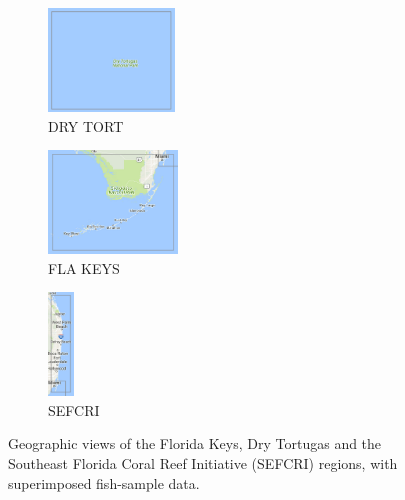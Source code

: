 \documentclass[letterpaper]{article} %
\begin{document}
\begin{figure}
  \centering
    \begin{subfigure}[b]{.4\columnwidth}
      \centering
      \includegraphics[height=2.75cm]{./figs/DRY_TORT.png}
      \caption{DRY TORT}
      \label{fig:drytort}
    \end{subfigure}
    \begin{subfigure}[b]{.4\columnwidth}
      \centering
      \includegraphics[height=2.75cm]{./figs/FLA_KEYS.png}
      \caption{FLA KEYS}
      \label{fig:flakeys}
    \end{subfigure}
    \begin{subfigure}[b]{.18\columnwidth}
      \centering
      \includegraphics[height=2.75cm]{./figs/SEFCRI.png}
      \caption{SEFCRI}
      \label{fig:sefcri}
    \end{subfigure}
  \caption{Geographic views of the Florida Keys, Dry Tortugas and the Southeast
  Florida Coral Reef Initiative (SEFCRI) regions, with superimposed fish-sample
data.}
  \label{fig:geo}
\end{figure}
\end{document}
